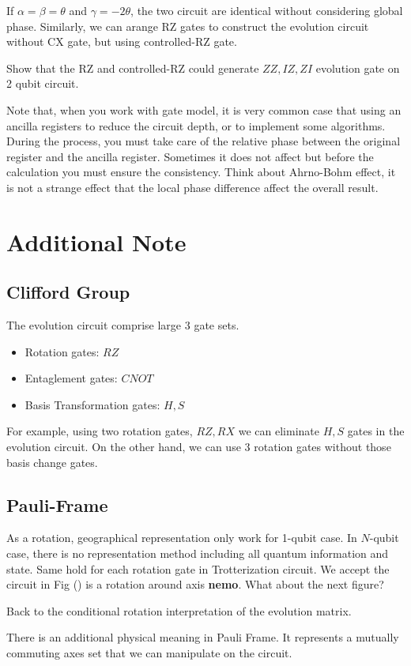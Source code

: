 If $\alpha = \beta = \theta$ and $\gamma = -2 \theta$, the two circuit are identical
without considering global phase.
Similarly, we can arange RZ gates to construct the evolution circuit 
without CX gate, but using controlled-RZ gate.

\begin{exercise}
    Show that the RZ and controlled-RZ could generate $ZZ, IZ, ZI$ evolution gate 
    on 2 qubit circuit. 
\end{exercise}


Note that, when you work with gate model,
it is very common case that using an ancilla registers
to reduce the circuit depth, or to implement some algorithms.
During the process, you must take care of the relative 
phase between the original register and the ancilla register.
Sometimes it does not affect but before the calculation 
you must ensure the consistency.
Think about Ahrno-Bohm effect, it is not a strange 
effect that the local phase difference affect the overall
result.


\section{Additional Note}


\subsection{Clifford Group}

The evolution circuit comprise large 3 gate sets.

\begin{itemize}
    \item Rotation gates: $RZ$
    \item Entaglement gates: $CNOT$
    \item Basis Transformation gates: $H, S$
\end{itemize}


For example, using two rotation gates, $RZ, RX$
we can eliminate $H, S$ gates in the evolution circuit.
On the other hand, we can use 3 rotation gates
without those basis change gates. 






\subsection{Pauli-Frame}

As a rotation, geographical representation only work for 
1-qubit case.
In $N$-qubit case, there is no representation method 
including all quantum information and state.
Same hold for each rotation gate in Trotterization circuit.
We accept the circuit in Fig () is a rotation around axis \textbf{nemo}.
What about the next figure?


Back to the conditional rotation interpretation of 
the evolution matrix.



There is an additional physical meaning in Pauli Frame.
It represents a mutually commuting axes set that we 
can manipulate on the circuit.
